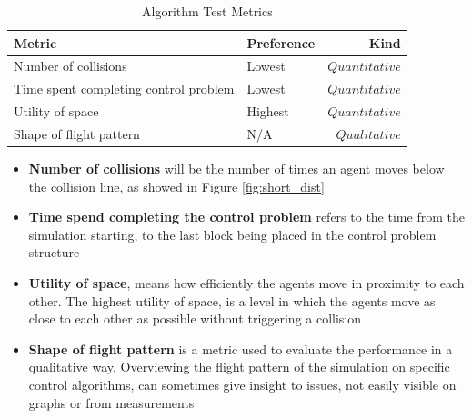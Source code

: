 \begin{table}[H]
\centering
\begin{tabularx}{1\textwidth}{l@{ }Xr}
\toprule
\textbf{Metric} &\textbf{Preference} & \textbf{Kind} \\ \midrule
Number of collisions  & Lowest & ${Quantitative}$  \\
Time spent completing control problem & Lowest & ${Quantitative}$  \\
Utility of space & Highest & ${Quantitative}$  \\
Shape of flight pattern  & N/A & ${Qualitative}$  \\
\bottomrule
\end{tabularx}
\caption{Algorithm Test Metrics}
\label{tab:test_metrics}
\end{table}

\begin{itemize}
\item{\textbf{Number of collisions} will be the number of times an agent moves below the collision line, as showed in Figure \ref{fig:short_dist}}
\item{\textbf{Time spend completing the control problem} refers to the time from the simulation starting, to the last block being placed in the control problem structure}
\item{\textbf{Utility of space}, means how efficiently the agents move in proximity to each other. The highest utility of space, is a level in which the agents move as close to each other as possible without triggering a collision}
\item{\textbf{Shape of flight pattern} is a metric used to evaluate the performance in a qualitative way. Overviewing the flight pattern of the simulation on specific control algorithms, can sometimes give insight to issues, not easily visible on graphs or from measurements}
\end{itemize}

